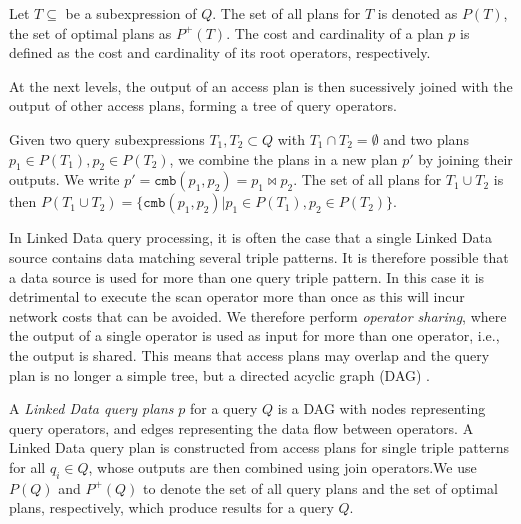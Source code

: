 \begin{definition}
  Let $T \subseteq$ be a subexpression of $Q$. The set of all plans
  for $T$ is denoted as $P(T)$, the set of optimal plans as
  $P^+(T)$. The cost and cardinality of a plan $p$ is defined as the
  cost and cardinality of its root operators, respectively.
\end{definition}

At the next levels, the output of an access plan is then sucessively
joined with the output of other access plans, forming a tree of query
operators. 

\begin{definition}
  Given two query subexpressions $T_1,T_2 \subset Q$ with $T_1 \cap
  T_2 = \emptyset$ and two plans $p_1 \in P(T_1), p_2 \in P(T_2)$, we
  combine the plans in a new plan $p'$ by joining their outputs. We
  write $p' = \mathtt{cmb}(p_1, p_2) = p_1 \Join p_2$. The set of all
  plans for $T_1 \cup T_2$ is then $P(T_1 \cup T_2) =
  \{\mathtt{cmb}(p_1,p_2) | p_1 \in P(T_1), p_2 \in P(T_2)\}$.
\end{definition}

In Linked Data query processing, it is often the case that a single
Linked Data source contains data matching several triple patterns. It
is therefore possible that a data source is used for more than one
query triple pattern. In this case it is detrimental to execute the
scan operator more than once as this will incur network costs that can
be avoided. We therefore perform \emph{operator sharing}, where the
output of a single operator is used as input for more than one
operator, i.e., the output is shared. This means that access plans may
overlap and the query plan is no longer a simple tree, but a directed
acyclic graph (DAG) \cite{Neumann_2005}.

\begin{definition}
  A \emph{Linked Data query plans} $p$ for a query $Q$ is a DAG with
  nodes representing query operators, and edges representing the data
  flow between operators. A Linked Data query plan is constructed from
  access plans for single triple patterns for all $q_i \in Q$, whose
  outputs are then combined using join operators.We use $P(Q)$ and
  $P^+(Q)$ to denote the set of all query plans and the set of optimal
  plans, respectively, which produce results for a query $Q$.
\end{definition}



